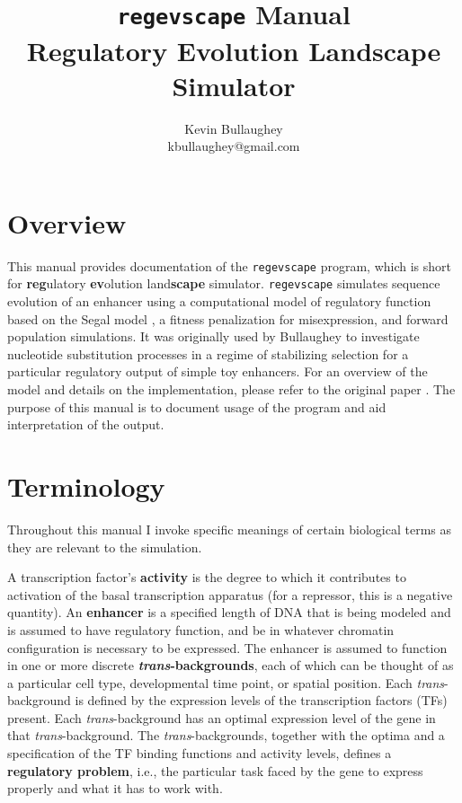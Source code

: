 \documentclass[11pt]{article}
\author{Kevin Bullaughey \\ \normalsize{kbullaughey@gmail.com}}
\title{\texttt{regevscape} Manual\\ \normalsize{Regulatory Evolution Landscape Simulator}}
\begin{document}
\maketitle
\pagebreak
\tableofcontents
\pagebreak

\section{Overview}

This manual provides documentation of the \texttt{regevscape} program, which is short for \textbf{reg}ulatory \textbf{ev}olution land\textbf{scape} simulator. \texttt{regevscape} simulates sequence evolution of an enhancer using a computational model of regulatory function based on the Segal model \cite{Segal:2008p460}, a fitness penalization for misexpression, and forward population simulations. It was originally used by Bullaughey \cite{Bullaughey:2011p6261} to investigate nucleotide substitution processes in a regime of stabilizing selection for a particular regulatory output of simple toy enhancers. For an overview of the model and details on the implementation, please refer to the original paper \cite{Bullaughey:2011p6261}. The purpose of this manual is to document usage of the program and aid interpretation of the output.

\section{Terminology}

Throughout this manual I invoke specific meanings of certain biological terms as they are relevant to the simulation. 

A transcription factor's \textbf{activity} is the degree to which it contributes to activation of the basal transcription apparatus (for a repressor, this is a negative quantity). An \textbf{enhancer} is a specified length of DNA that is being modeled and is assumed to have regulatory function, and be in whatever chromatin configuration is necessary to be expressed. The enhancer is assumed to function in one or more discrete \textbf{\emph{trans}-backgrounds}, each of which can be thought of as a particular cell type, developmental time point, or spatial position. Each \emph{trans}-background is defined by the expression levels of the transcription factors (TFs) present. Each \emph{trans}-background has an optimal expression level of the gene in that \emph{trans}-background. The \emph{trans}-backgrounds, together with the optima and a specification of the TF binding functions and activity levels, defines a \textbf{regulatory problem}, i.e., the particular task faced by the gene to express properly and what it has to work with.
\end{document}
